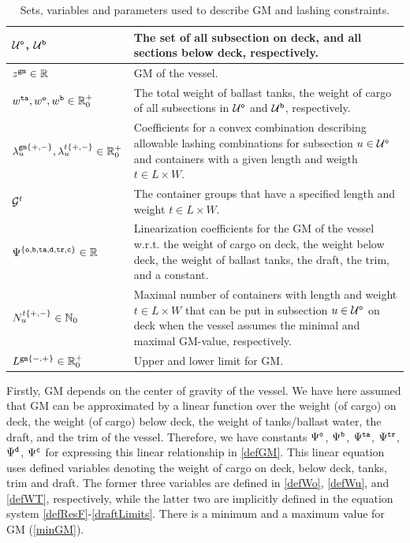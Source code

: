 \begin{table}
\centering
\btsize
\begin{tabular}{lp{10cm}}
$\mathcal{U}^\texttt{o}$, $\mathcal{U}^\texttt{b}$	& The set of all subsection on deck, and all sections below deck, respectively.\\
\hline 
$z^{\texttt{gm}}\in\mathbb{R}$					&	GM of the vessel.\\
$w^{\texttt{ta}}, w^\texttt{o}, w^\texttt{b}\in\mathbb{R}^+_0$	
																		&	The total weight of ballast tanks, the weight of cargo of all subsections in $\mathcal{U}^\texttt{o}$  and $\mathcal{U}^\texttt{b}$, respectively.\\
$\lambda^{\texttt{gm}\{+,-\}}_{u}, \lambda^{t\{+,-\}}_{u}\in\mathbb{R}^+_0$ 
																		&	Coefficients for a convex combination describing allowable lashing combinations for subsection $u\in \mathcal{U}^\texttt{o}$ and containers with a given length and weigth $t\in L\times W$.\\
\hline
$\mathcal{G}^t$													& The container groups that have a specified length and weight $t\in L\times W$.\\
$\Psi^{\{\tt{o},\texttt{b},\texttt{ta},\texttt{d},\texttt{tr},\texttt{c}\}}\in\mathbb{R}$	
																		& Linearization coefficients for the GM of the vessel w.r.t. the weight of cargo on deck, the weight below deck, the weight of ballast tanks, the draft, the trim, and a constant.\\
$N^{t\{+,-\}}_{u}\in\mathbb{N}_0$				& Maximal number of containers with length and weight $t\in L\times W$ that can be put in subsection $u\in \mathcal{U}^\texttt{o}$ on deck when the vessel assumes the minimal and maximal GM-value, respectively.\\
$L^{\texttt{gm}\{-,+\}}\in\mathbb{R}^+_0$ 	& Upper and lower limit for GM.
\end{tabular}
\etsize
\caption{Sets, variables and parameters used to describe GM and lashing constraints.}\label{tab:gm}
\end{table}
 
Firstly, GM depends on the center of gravity of the vessel. We have here assumed that GM can be approximated by a linear function over the weight (of cargo) on deck, the weight (of cargo) below deck, the weight of tanks/ballast water, the draft, and the trim of the vessel. Therefore, we have constants $\Psi^{\texttt{o}}$, $\Psi^{\texttt{b}}$, $\Psi^{\texttt{ta}}$, $\Psi^{\texttt{tr}}$, $\Psi^{\texttt{d}}$, $\Psi^{\texttt{c}}$ for expressing this linear relationship in \eqref{defGM}. This linear equation uses defined variables denoting the weight of cargo on deck, below deck, tanks, trim and draft. The former three variables are defined in \eqref{defWo}, \eqref{defWu}, and \eqref{defWT}, respectively, while the latter two are implicitly defined in the equation system \eqref{defResF}-\eqref{draftLimits}. There is a minimum and a maximum value for GM (\ref{minGM}). %

